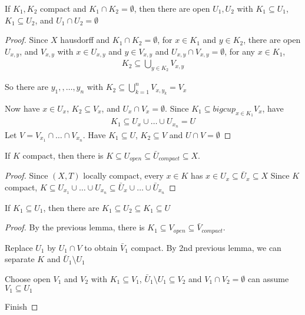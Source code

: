 \begin{lemma}
	If $K_{1}, K_{2}$ compact and $K_{1} \cap K_2 = \emptyset$, then there are open $U_{1} , U_{2}$ with $K_{1} \subseteq U_{1}$, $K_{1} \subseteq U_{2}$, and $U_1 \cap U_2 = \emptyset$
\end{lemma}

\begin{proof}
	Since $X$ hausdorff and $K_1 \cap K_2 = \emptyset$, for  $x \in K_1$ and $y \in K_2$, there are open $U_{x,y}$, and $V_{x,y}$ with $x \in U_{x,y}$ and $y \in V_{x,y}$ and $U_{x,y} \cap V_{x,y} = \emptyset$, for any $x \in K_1$,
	\begin{align*}
		K_2 \subseteq \bigcup_{y \in K_2} V_{x,y}
	\end{align*} 

	So there are $y_1, ,\ldots , y_n$ with $K_2 \subseteq \bigcup_{k=1}^n V_{x, y_{k}} = V_{x}$

	Now have $x \in U_{x}$, $K_2 \subseteq V_x$, and $U_{x} \cap V_{x} = \emptyset$. Since $K_{1} \subseteq bigcup_{x \in K_1} V_x$, have 
	\begin{align*}
		K_1 \subseteq U_{x} \cup \ldots \cup U_{x_{n}} = U
	\end{align*} 
	Let $V = V_{x_{1}} \cap \ldots \cap V_{x_{n}}$. Have $K_{1} \subseteq U$, $K_{2} \subseteq V$ and $U \cap V = \emptyset$
\end{proof}

\begin{lemma}
	If $K$ compact, then there is $K \subseteq U_{open} \subseteq \bar{U}_{compact} \subseteq X$.
\end{lemma}

\begin{proof}
	Since $(X,T)$ locally compact, every $x \in K$ has $x \in U_{x} \subseteq \bar{U}_x \subseteq X$
	Since $K$ compact, $K \subseteq U_{x_1} \cup \ldots \cup U_{x_n} \subseteq \bar{U}_x \cup \ldots \cup \bar{U}_{x_{n}}$
\end{proof}

\begin{lemma}
	If $K_1 \subseteq U_1$, then there are  $K_1 \subseteq U_{2} \subseteq K_1 \subseteq U$
\end{lemma}

\begin{proof}
	By the previous lemma, there is $K_1 \subseteq V_{open} \subseteq \bar{V}_{compact}$.

	Replace $U_{1}$ by $U_{1} \cap V$ to obtain $\bar{V}_{1}$ compact. By 2nd previous lemma, we can separate $K$ and $\bar{U}_1 \setminus U_{1}$

	Choose open $V_1$ and $V_2$ with $K_{1} \subseteq V_{1}$,  $\bar{U}_1 \setminus U_1 \subseteq V_{2}$
and $V_{1} \cap V_{2} = \emptyset$ can assume $V_{1} \subseteq U_{1}$

Finish
\end{proof}

